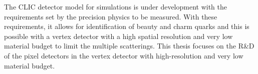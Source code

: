 The CLIC detector model for simulations is under development with the
requirements set by the precision physics to be measured. With these
requirements, it allows for identification of beauty and charm quarks
and this is possible with a vertex detector with a high spatial
resolution and very low material budget to limit the multiple
scatterings. This thesis focuses on the R\&D of the pixel detectors in
the vertex detector with high-resolution and very low material budget.




